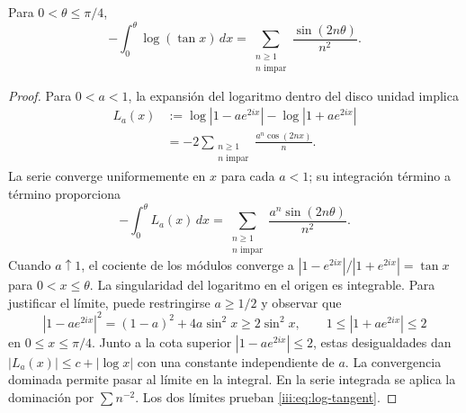 \begin{lemma}
\label{iii:lem:log-tangent}
Para $0<\theta\leq\pi/4$,
\begin{equation}
 -\int_0^\theta\log(\tan x)\,dx
 =\sum_{\substack{n\geq1\\n\text{ impar}}}
      \frac{\sin(2n\theta)}{n^2}.
 \label{iii:eq:log-tangent}
\end{equation}
\end{lemma}
\begin{proof}
Para $0<a<1$, la expansión del logaritmo dentro del disco unidad implica
\begin{align*}
 L_a(x)
 &:=\log|1-ae^{2ix}|-\log|1+ae^{2ix}|\\
 &=-2\sum_{\substack{n\geq1\\n\text{ impar}}}
       \frac{a^n\cos(2nx)}{n}.
\end{align*}
La serie converge uniformemente en $x$ para cada $a<1$; su integración
término a término proporciona
\[
 -\int_0^\theta L_a(x)\,dx
 =\sum_{\substack{n\geq1\\n\text{ impar}}}
       \frac{a^n\sin(2n\theta)}{n^2}.
\]
Cuando $a\uparrow1$, el cociente de los módulos converge a
$|1-e^{2ix}|/|1+e^{2ix}|=\tan x$ para $0<x\leq\theta$.
La singularidad del logaritmo en el origen es integrable. Para justificar
el límite, puede restringirse $a\geq1/2$ y observar que
\[
 |1-ae^{2ix}|^2=(1-a)^2+4a\sin^2x
 \geq2\sin^2x,
 \qquad 1\leq|1+ae^{2ix}|\leq2
\]
en $0\leq x\leq\pi/4$. Junto a la cota superior
$|1-ae^{2ix}|\leq2$, estas desigualdades dan
$|L_a(x)|\leq c+|\log x|$ con una constante independiente de $a$.
La convergencia dominada permite pasar al límite en la integral.
En la serie integrada se aplica la dominación por $\sum n^{-2}$.
Los dos límites prueban \eqref{iii:eq:log-tangent}.
\end{proof}

